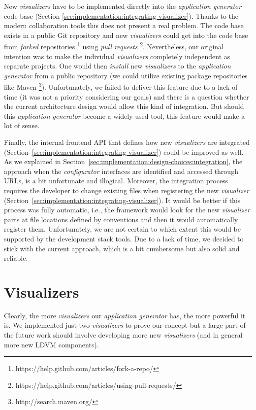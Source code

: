 New \emph{visualizers} have to be implemented directly into the \emph{application generator} code base (Section \ref{sec:implementation:integrating-visualizer}). Thanks to the modern collaboration tools this does not present a real problem. The code base exists in a public Git repository and new \emph{visualizers} could get into the code base from \emph{forked} repositories \footnote{https://help.github.com/articles/fork-a-repo/} using \emph{pull requests} \footnote{https://help.github.com/articles/using-pull-requests/}. Nevertheless, our original intention was to make the individual \emph{visualizers} completely independent as separate projects. One would then \emph{install} new \emph{visualizers} to the \emph{application generator} from a public repository (we could utilize existing package repositories like Maven \footnote{http://search.maven.org/}). Unfortunately, we failed to deliver this feature due to a lack of time (it was not a priority considering our goals) and there is a question whether the current architecture design would allow this kind of integration. But should this \emph{application generator} become a widely used tool, this feature would make a lot of sense.

Finally, the internal frontend API that defines how new \emph{visualizers} are integrated (Section~\ref{sec:implementation:integrating-visualizer}) could be improved as well. As we explained in Section~\ref{sec:implementation:design-choices:integration}, the approach when the \emph{configurator} interfaces are identified and accessed through URLs, is a bit unfortunate and illogical. Moreover, the integration process requires the developer to change existing files when registering the new \emph{visualizer} (Section~\ref{sec:implementation:integrating-visualizer}). It would be better if this process was fully automatic, i.e., the framework would look for the new \emph{visualizer} parts at file locations defined by conventions and then it would automatically register them. Unfortunately, we are not certain to which extent this would be supported by the development stack tools. Due to a lack of time, we decided to stick with the current approach, which is a bit cumbersome but also solid and reliable.

\section{Visualizers}

Clearly, the more \emph{visualizers} our \emph{application generator} has, the more powerful it is. We implemented just two \emph{visualizers} to prove our concept but a large part of the future work should involve developing more new \emph{visualizers} (and in general more new LDVM components).

